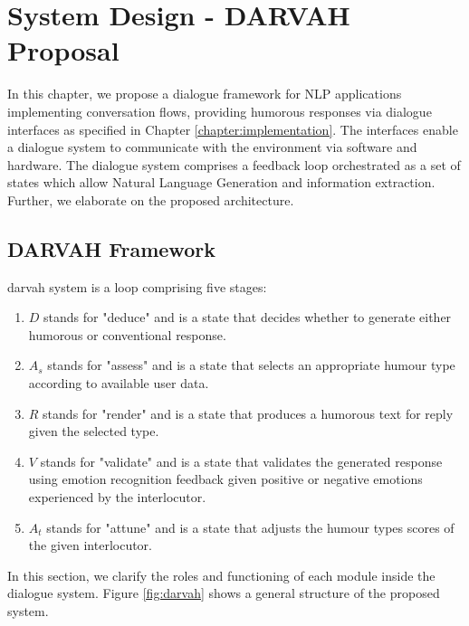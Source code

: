 
\chapter{System Design - DARVAH Proposal}\label{chapter:systemdesign}

In this chapter, we propose a dialogue framework for NLP applications implementing conversation flows, providing humorous responses via dialogue interfaces as specified in Chapter \ref{chapter:implementation}. The interfaces enable a dialogue system to communicate with the environment via software and hardware. The dialogue system comprises a feedback loop orchestrated as a set of states which allow Natural Language Generation and information extraction. Further, we elaborate on the proposed architecture. \par

\section{DARVAH Framework}\label{section:darvah}

\acrshort{darvah} system is a loop comprising five stages:
\begin{enumerate}
     \item \( D\) stands for "deduce" and is a state that decides whether to generate either humorous or conventional response.
     \item \( A_s\) stands for "assess" and is a state that selects an appropriate humour type according to available user data.
     \item \( R\) stands for "render" and is a state that produces a humorous text for reply given the selected type.
     \item \( V\) stands for "validate" and is a state that validates the generated response using emotion recognition feedback given positive or negative emotions experienced by the interlocutor.
     \item \( A_t\) stands for "attune" and is a state that adjusts the humour types scores of the given interlocutor.
\end{enumerate}
In this section, we clarify the roles and functioning of each module inside the dialogue system. Figure \ref{fig:darvah} shows a general structure of the proposed system. \par

